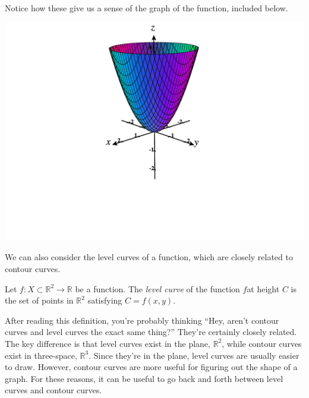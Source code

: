 \documentclass{ximera}
\begin{document}
\begin{example}
Notice how these give us a sense of the graph of the function, included below.

\begin{image}
\includegraphics[width = \textwidth]{CalcPlot3D-x2plusy2}
\end{image}
\end{example}

We can also consider the level curves of a function, which are closely related to contour curves.

\begin{definition}
Let $f:X\subset\mathbb{R}^2\rightarrow\mathbb{R}$ be a function. The \emph{level curve} of the function $f$at height $C$ is the set of points in $\mathbb{R}^2$ satisfying $C = f(x,y)$.
\end{definition}

After reading this definition, you're probably thinking ``Hey, aren't contour curves and level curves the exact same thing?'' They're certainly closely related. The key difference is that level curves exist in the plane, $\mathbb{R}^2$, while contour curves exist in three-space, $\mathbb{R}^3$. Since they're in the plane, level curves are usually easier to draw. However, contour curves are more useful for figuring out the shape of a graph. For these reasons, it can be useful to go back and forth between level curves and contour curves.
\end{document}
